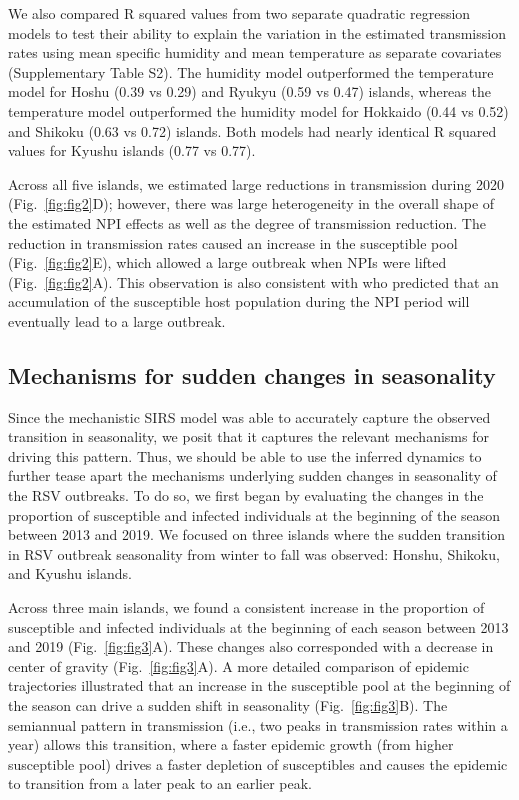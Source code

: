 \documentclass[12pt]{article}
\newcommand{\fref}[1]{Fig.~\ref{fig:#1}}
\begin{document}
We also compared R squared values from two separate quadratic regression models to test their ability to explain the variation in the estimated transmission rates using mean specific humidity and mean temperature as separate covariates (Supplementary Table S2).
The humidity model outperformed the temperature model for Hoshu (0.39 vs 0.29) and Ryukyu  (0.59 vs 0.47) islands, whereas the temperature model outperformed the humidity model for Hokkaido (0.44 vs 0.52) and Shikoku (0.63 vs 0.72) islands.
Both models had nearly identical R squared values for Kyushu islands (0.77 vs 0.77).

Across all five islands, we estimated large reductions in transmission during 2020  (\fref{fig2}D);
however, there was large heterogeneity in the overall shape of the estimated NPI effects as well as the degree of transmission reduction.
The reduction in transmission rates caused an increase in the susceptible pool (\fref{fig2}E), which allowed a large outbreak when NPIs were lifted (\fref{fig2}A).
This observation is also consistent with \cite{baker2019epidemic} who predicted that an accumulation of the susceptible host population during the NPI period will eventually lead to a large outbreak.

\subsection*{Mechanisms for sudden changes in seasonality}

Since the mechanistic SIRS model was able to accurately capture the observed transition in seasonality, we posit that it captures the relevant mechanisms for driving this pattern.
Thus, we should be able to use the inferred dynamics to further tease apart the mechanisms underlying sudden changes in seasonality of the RSV outbreaks.
To do so, we first began by evaluating the changes in the proportion of susceptible and infected individuals at the beginning of the season between 2013 and 2019.
We focused on three islands where the sudden transition in RSV outbreak seasonality from winter to fall was observed: Honshu, Shikoku, and Kyushu islands. 

Across three main islands, we found a consistent increase in the proportion of susceptible and infected individuals at the beginning of each season between 2013 and 2019 (\fref{fig3}A).
These changes also corresponded with a decrease in center of gravity (\fref{fig3}A).
A more detailed comparison of epidemic trajectories illustrated that an increase in the susceptible pool at the beginning of the season can drive a sudden shift in seasonality (\fref{fig3}B).
The semiannual pattern in transmission (i.e., two peaks in transmission rates within a year) allows this transition, where a faster epidemic growth (from higher susceptible pool) drives a faster depletion of susceptibles and causes the epidemic to transition from a later peak to an earlier peak.
\end{document}
